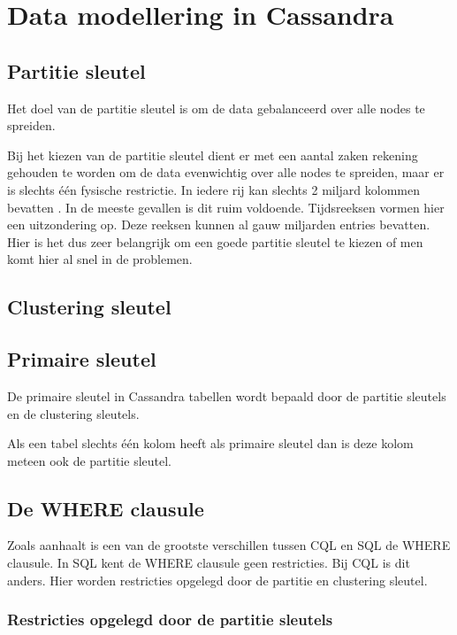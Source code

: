 \chapter{Data modellering in Cassandra}
\label{ch:cassandra_modelling}

\section{Partitie sleutel}
Het doel van de partitie sleutel is om de data gebalanceerd over alle nodes te spreiden.

Bij het kiezen van de partitie sleutel dient er met een aantal zaken rekening gehouden te worden om de data evenwichtig over alle nodes te spreiden, maar er is slechts één fysische restrictie.
In iedere rij kan slechts 2 miljard kolommen bevatten \citep{McFadin2013Timeseries}.
In de meeste gevallen is dit ruim voldoende.
Tijdsreeksen vormen hier een uitzondering op.
Deze reeksen kunnen al gauw miljarden entries bevatten.
Hier is het dus zeer belangrijk om een goede partitie sleutel te kiezen of men komt hier al snel in de problemen.

\section{Clustering sleutel}

\section{Primaire sleutel}
De primaire sleutel in Cassandra tabellen wordt bepaald door de partitie sleutels en de clustering sleutels.

Als een tabel slechts één kolom heeft als primaire sleutel dan is deze kolom meteen ook de partitie sleutel.

\section{De WHERE clausule}
Zoals \cite{Lerer2015Where} aanhaalt is een van de grootste verschillen tussen CQL en SQL de WHERE clausule.
In SQL kent de WHERE clausule geen restricties.
Bij CQL is dit anders.
Hier worden restricties opgelegd door de partitie en clustering sleutel.

\subsection{Restricties opgelegd door de partitie sleutels}

